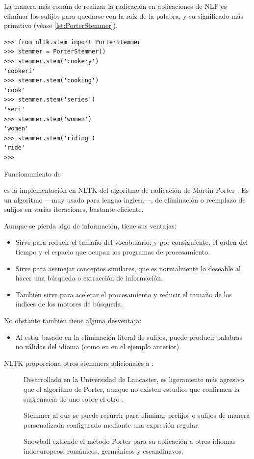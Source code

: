La manera más común de realizar la radicación en aplicaciones de NLP es eliminar los sufijos para quedarse con la raíz de la palabra, y su significado más primitivo (véase \autoref{lst:PorterStemmer}).

\begin{listing}[H]
\begin{verbatim}
>>> from nltk.stem import PorterStemmer
>>> stemmer = PorterStemmer()
>>> stemmer.stem('cookery')
'cookeri'
>>> stemmer.stem('cooking')
'cook'
>>> stemmer.stem('series')
'seri'
>>> stemmer.stem('women')
'women'
>>> stemmer.stem('riding')
'ride'
>>> 
\end{verbatim}
\caption{Funcionamiento de }
\label{lst:PorterStemmer}
\end{listing}

 es la implementación en NLTK del algoritmo de radicación de Martin Porter \citep{Porter1980}. Es un algoritmo ---muy usado para lengua inglesa---, de eliminación o reemplazo de sufijos en varias iteraciones, bastante eficiente.

Aunque se pierda algo de información, tiene sus ventajas:
\nopagebreak
\begin{itemize}
\item Sirve para reducir el tamaño del vocabulario; y por consiguiente, el orden del tiempo y el espacio que ocupan los programas de procesamiento.
\item Sirve para asemejar conceptos similares, que es normalmente lo deseable al hacer una búsqueda o extracción de información.
\item También sirve para acelerar el procesamiento y reducir el tamaño de los índices de los motores de búsqueda.
\end{itemize}

No obstante también tiene alguna desventaja:
\nopagebreak
\begin{itemize}
\item Al estar basado en la eliminación literal de sufijos, puede producir palabras no válidas del idioma (como en  en el ejemplo anterior).
\end{itemize}

NLTK proporciona otros stemmers adicionales a :
\begin{description}
\item[] Desarrollado en la Universidad de Lancaster, es ligeramente más agresivo que el algoritmo de Porter, aunque no existen estudios que confirmen la supremacía de uno sobre el otro \citep{Perkins2014}.
\item[] Stemmer al que se puede recurrir para eliminar prefijos o sufijos de manera personalizada configurado mediante una expresión regular.
\item[] Snowball extiende el método Porter para su aplicación a otros idiomas indoeuropeos: románicos, germánicos y escandinavos.
\end{description}

